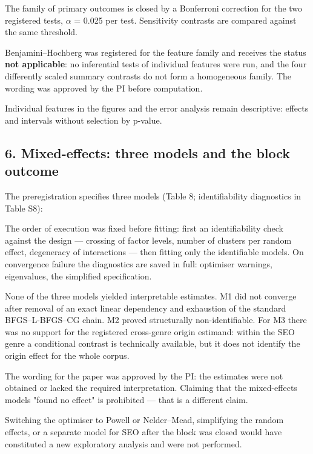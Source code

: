 \documentclass[11pt,a4paper]{article}
\renewcommand{\_}{\textunderscore\allowbreak}
\begin{document}
The family of primary outcomes is closed by a Bonferroni correction for the two
registered tests, $\alpha$ = 0.025 per test. Sensitivity contrasts are compared against
the same threshold.

Benjamini–Hochberg was registered for the feature family and receives the status
\textbf{not applicable}: no inferential tests of individual features were run, and the
four differently scaled summary contrasts do not form a homogeneous family. The
wording was approved by the PI before computation.

Individual features in the figures and the error analysis remain descriptive:
effects and intervals without selection by p-value.

\subsection{6. Mixed-effects: three models and the block outcome}

The preregistration specifies three models (Table 8; identifiability diagnostics
in Table S8):

\setcounter{table}{7}


The order of execution was fixed before fitting: first an identifiability check
against the design — crossing of factor levels, number of clusters per random
effect, degeneracy of interactions — then fitting only the identifiable models.
On convergence failure the diagnostics are saved in full: optimiser warnings,
eigenvalues, the simplified specification.

None of the three models yielded interpretable estimates. M1 did not converge
after removal of an exact linear dependency and exhaustion of the standard
BFGS–L-BFGS–CG chain. M2 proved structurally non-identifiable. For M3 there was no
support for the registered cross-genre origin estimand: within the SEO genre a
conditional contrast is technically available, but it does not identify the origin
effect for the whole corpus.

The wording for the paper was approved by the PI: the estimates were not obtained
or lacked the required interpretation. Claiming that the mixed-effects models
"found no effect" is prohibited — that is a different claim.

Switching the optimiser to Powell or Nelder–Mead, simplifying the random effects,
or a separate model for SEO after the block was closed would have constituted a
new exploratory analysis and were not performed.
\end{document}

